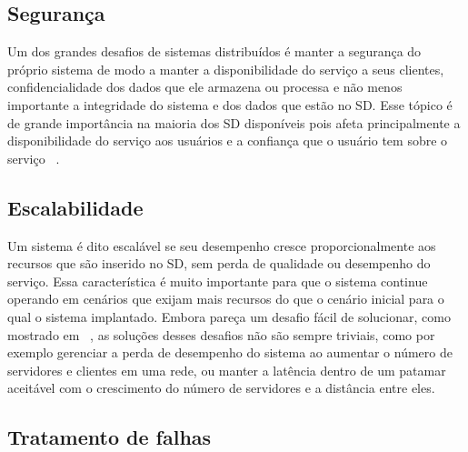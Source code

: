     \subsection{Segurança}
Um dos grandes desafios de sistemas distribuídos é manter a segurança do próprio sistema de modo a manter a disponibilidade do serviço a seus clientes, confidencialidade dos dados que ele armazena ou processa e não menos importante a integridade do sistema e dos dados que estão no SD. Esse tópico é de grande importância na maioria dos SD disponíveis pois afeta principalmente a disponibilidade do serviço aos usuários e a confiança que o usuário tem sobre o serviço ~\cite{coulouris}.
    
    \subsection{Escalabilidade}
        Um sistema é dito escalável se seu desempenho cresce proporcionalmente aos recursos que são inserido no SD, sem perda de qualidade ou desempenho do serviço. Essa característica é muito importante para que o sistema continue operando em cenários que exijam mais recursos do que o cenário inicial para o qual o sistema implantado. Embora pareça um desafio fácil de solucionar, como mostrado em ~\cite{coulouris}, as soluções desses desafios não são sempre triviais, como por exemplo gerenciar a perda de desempenho do sistema ao aumentar o número de servidores e clientes em uma rede, ou manter a latência dentro de um patamar aceitável com o crescimento do número de servidores e a distância entre eles.
    
    \subsection{Tratamento de falhas}

